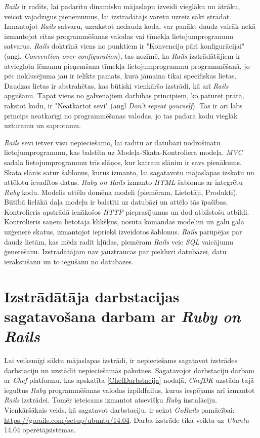 \textit{Rails} ir radīts, lai padarītu dinamisku mājaslapu izveidi vieglāku un ātrāku, veicot vajadzīgus pieņēmumus, lai izstrādātājs varētu uzreiz sākt strādāt. Izmantojot \textit{Rails} satvaru, uzrakstot nedaudz koda, var panākt daudz vairāk nekā izmantojot citas programmēšanas valodas vai tīmekļa lietojumprogrammu satvarus. \textit{Rails} doktrīnā viens no punktiem ir "Konvencija pāri konfigurācijai" (angl. \textit{Convention over configuration}), tas nozīmē, ka \textit{Rails} izstrādātājiem ir atvieglota lēmumu pieņemšana tīmekļa lietojumprogrammu programmēšanā, jo pēc noklusējuma jau ir ielikts pamats, kurā jāmaina tikai specifiskas lietas. Daudzas lietas ir abstrahētas, kas būtiski vienkāršo izstrādi, kā arī \textit{Rails} apgūšanu. Tāpat viens no galvenajiem darbības principiem, ko paturēt prātā, rakstot kodu, ir "Neatkārtot sevi" (angl \textit{Don't repeat yourself}). Tas ir arī labs princips neatkarīgi no programmēšanas valodas, jo tas padara kodu vieglāk uzturamu un saprotamu.
\cite[1.1 nodaļa]{hartlRails} \cite[getting_started]{rails-guides}

\textit{Rails} sevī ietver visu nepieciešamo, lai radītu ar datubāzi nodrošinātu lietojumprogrammu, kas balstīta uz Modeļa-Skata-Kontroliera  modeļa.
\textit{MVC} sadala lietojumprogrammu trīs slāņos, kur katram slānim ir savs pienākums.
Skata slānis satur šablonus, kurus izmanto, lai sagatavotu mājaslapas izskatu un attēlotu ievadītos datus. \textit{Ruby on Rails} izmanto \textit{HTML} šablonus ar integrētu \textit{Ruby} kodu.
Modelis attēlo domēna modeli (piemēram, Lietotāji, Produkti). Būtībā lielākā daļa modeļu ir balstīti uz datubāzi un attēlo tās īpašības.
Kontrolieris apstrādā ienākošos \textit{HTTP} pieprasījumus un dod atbilstošu atbildi. Kontrolieris saņem lietotāja klikšķus, nosūta komandas modelim un galu galā uzģenerē skatus, izmantojot iepriekš izveidotos šablonus.
\cite{rails-api}
\textit{Rails} parūpējas par daudz lietām, kas mēdz radīt kļūdas, piemēram \textit{Rails} veic \textit{SQL} vaicājumu ģenerēšanu. Izstrādātājam nav jāuztraucas par piekļuvi datubāzei, datu ierakstīšanu un to iegūšanu no datubāzes.

\section{Izstrādātāja darbstacijas sagatavošana darbam ar \textit{Ruby on Rails}} \label{RubyDarbstacija}
Lai veiksmīgi sāktu mājaslapas izstrādi, ir nepieciešams sagatavot izstrādes darbstaciju un uzstādīt nepieciešamās pakotnes. Sagatavojot darbstaciju darbam ar \textit{Chef} platformu, kas apskatīta \ref{ChefDarbstacija} nodaļā, \textit{ChefDK} uzstāda tajā iegultus \textit{Ruby} programmēšanas valodas izpildfailus, kurus iespējams arī izmantot \textit{Rails} izstrādei. Tomēr ieteicams izmantot atsevišķu \textit{Ruby} instalāciju. Vienkāršākais veids, kā sagatavot darbstaciju, ir sekot \textit{GoRails} pamācībai: \url{https://gorails.com/setup/ubuntu/14.04}. Darba izstrāde tika veikta uz \textit{Ubuntu} 14.04 operētājsistēmas.


